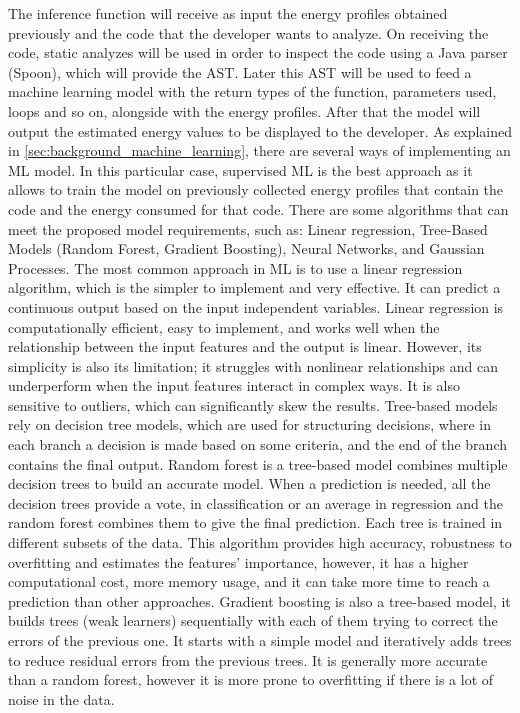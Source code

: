 \documentclass[sigplan]{acmart}
\begin{document}
The inference function will receive as input the energy profiles obtained previously and the code that the developer wants to analyze. On receiving the code, static analyzes will be used in order to inspect the code using a Java parser (Spoon), which will provide the AST. Later this AST will be used to feed a machine learning model with the return types of the function, parameters used, loops and so on, alongside with the energy profiles. After that the model will output the estimated energy values to be displayed to the developer.
As explained in \ref{sec:background_machine_learning}, there are several ways of implementing an ML model. In this particular case, supervised ML is the best approach as it allows to train the model on previously collected energy profiles that contain the code and the energy consumed for that code.
There are some algorithms that can meet the proposed model requirements, such as: Linear regression, Tree-Based Models (Random Forest, Gradient Boosting), Neural Networks, and Gaussian Processes.
The most common approach in ML is to use a linear regression algorithm, which is the simpler to implement and very effective. It can predict a continuous output based on the input independent variables. Linear regression is computationally efficient, easy to implement, and works well when the relationship between the input features and the output is linear. However, its simplicity is also its limitation; it struggles with nonlinear relationships and can underperform when the input features interact in complex ways. It is also sensitive to outliers, which can significantly skew the results.
Tree-based models rely on decision tree models, which are used for structuring decisions, where in each branch a decision is made based on some criteria, and the end of the branch contains the final output. Random forest is a tree-based model combines multiple decision trees to build an accurate model. When a prediction is needed, all the decision trees provide a vote, in classification or an average in regression and the random forest combines them to give the final prediction. Each tree is trained in different subsets of the data. This algorithm provides high accuracy, robustness to overfitting and estimates the features' importance, however, it has a higher computational cost, more memory usage, and it can take more time to reach a prediction than other approaches.
Gradient boosting is also a tree-based model, it builds trees (weak learners) sequentially with each of them trying to correct the errors of the previous one. It starts with a simple model and iteratively adds trees to reduce residual errors from the previous trees. It is generally more accurate than a random forest, however it is more prone to overfitting if there is a lot of noise in the data.
\end{document}
